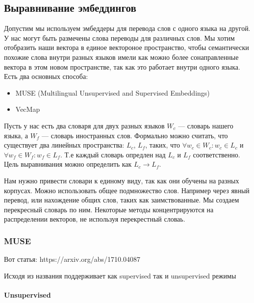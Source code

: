 \documentclass{article}
\begin{document}
    \subsection{Выравнивание эмбеддингов}

    Допустим мы используем эмбеддеры для перевода слов с одного языка на другой. У нас могут быть размечены слова переводы для различных слов. 
    Мы хотим отобразить наши вектора в единое вектороное пространство, чтобы семантически похожие слова внутри разных языков 
    имели как можно более сонаправленные вектора в этом новом пространстве, так как это работает внутри одного языка. Есть два основных способа:

    \begin{itemize}
        \item MUSE (Multilingual Unsupervised and Supervised Embeddings)
        \item VecMap
    \end{itemize}

    Пусть у нас есть два словаря для двух разных языков $W_{c}$ --- словарь нашего языка, а $W_{f}$ --- словарь иностранных слов. 
    Формально можно считать, что существует два линейных пространства: $L_{c}$, $L_{f}$, таких, что 
    $\forall w_{c} \in W_{c} : w_{c} \in L_{c}$ и $\forall w_{f} \in W_{f} : w_{f} \in L_{f}$.
    Т.е каждый словарь опредлен над $L_{c}$ и $L_{f}$ соответственно. Цель выравнивания можно определить как 
    $L_{c} \rightarrow L_{f}$.

    Нам нужно привести словари к единому виду, так как они обучены на разных корпусах. Можно использовать общее подмножество слов.
    Например через явный перевод, или нахождение общих слов, таких как заимствованные. Мы создаем перекресный словарь по ним.
    Некоторые методы концентрируются на распределении векторов, не используя перекрестный словаь.
    
    \subsubsection{MUSE}

    Вот статья: https://arxiv.org/abs/1710.04087

    Исходя из названия поддерживает как supervised так и unsupervised режимы 

    \paragraph{Unsupervised}
\end{document}
